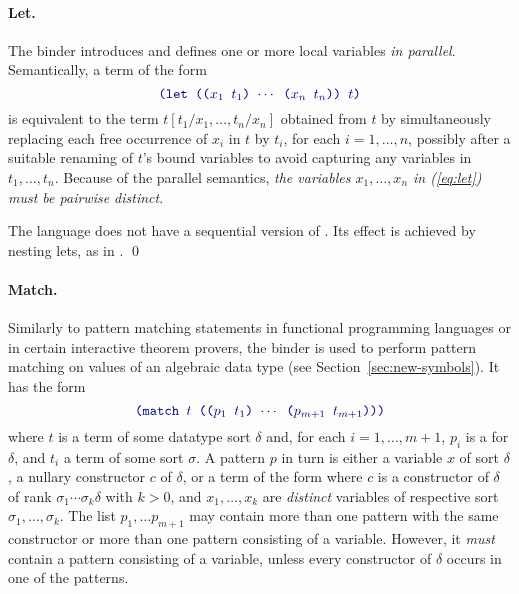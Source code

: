 \paragraph{Let.}
The  binder introduces and defines 
one or more local variables \emph{in parallel}.
Semantically, a term of the form
%
\begin{equation} \label{eq:let}
\expr{(let (($x_1$ $t_1$) $\cdots$ ($x_n$ $t_n$)) $t$)}
\end{equation}
%
is equivalent to the term $t[t_1/x_1, \ldots, t_n/x_n]$ obtained from $t$ 
by simultaneously replacing each free occurrence of $x_i$ in $t$ by $t_i$, 
for each $i=1,\ldots,n$,
possibly after a suitable renaming of $t$'s bound variables 
to avoid capturing any variables in $t_1, \ldots, t_n$.
Because of the parallel semantics, 
\emph{the variables $x_1, \ldots, x_n$ in (\ref{eq:let}) must be pairwise distinct}.

\begin{remark}
The language does not have a sequential version of .
Its effect is achieved by nesting lets, as in 
.
\qed
\end{remark}

\paragraph{Match.}
Similarly to pattern matching statements in functional programming languages
or in certain interactive theorem provers,
the  binder is used to perform pattern matching on values 
of an algebraic data type (see Section~\ref{sec:new-symbols}).
It has the form
%
\begin{equation} \label{eq:match}
\expr{(match $t$ (($p_1$ $t_1$) $\cdots$ ($p_{m+1}$ $t_{m+1}$)))}
\end{equation}
%
where $t$ is a term of some datatype sort $\delta$ and,
for each $i=1,\ldots,m+1$,
$p_i$ is a  for $\delta$, and $t_i$ a term of some sort $\sigma$.
A pattern $p$ in turn is either a variable $x$ of sort $\delta$, 
a nullary constructor $c$ of $\delta$, 
or a term of the form 
where $c$ is a constructor of $\delta$ of rank
$\sigma_1\cdots\sigma_k\delta$ 
with $k > 0$, and $x_1, \ldots, x_k$ are \emph{distinct} variables 
of respective sort $\sigma_1,\ldots,\sigma_k$.
The list $p_1,\ldots p_{m+1}$ may contain more than one pattern with the same constructor 
or more than one pattern consisting of a variable.
However, it \emph{must} contain a pattern consisting of a variable, 
unless every constructor of $\delta$ occurs in one of the patterns.


